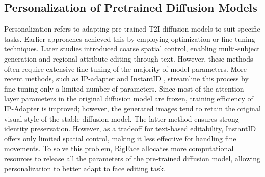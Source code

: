 \subsection{Personalization of Pretrained Diffusion Models}
Personalization refers to adapting pre-trained T2I diffusion models to suit specific tasks. Earlier approaches \cite{gal2022image,ruiz2023dreambooth} achieved this by employing optimization or fine-tuning techniques. Later studies \cite{gao2024adaptive,yan2023towards,huang2024detail,que2024denoising,papa2024d4d,kang2024image} introduced coarse spatial control, enabling multi-subject generation and regional attribute editing through text. However, these methods often require extensive fine-tuning of the majority of model parameters. More recent methods, such as IP-adapter \cite{ye2023ip} and InstantID \cite{wang2024instantid}, streamline this process by fine-tuning only a limited number of parameters. Since most of the attention layer parameters in the original diffusion model are frozen, training efficiency of IP-Adapter is improved; however, the generated images tend to retain the original visual style of the stable-diffusion model. The latter method ensures strong identity preservation. However, as a tradeoff for text-based editability, InstantID offers only limited spatial control, making it less effective for handling fine movements. To solve this problem, RigFace allocates more computational resources to release all the parameters of the pre-trained diffusion model, allowing personalization to better adapt to face editing task.
